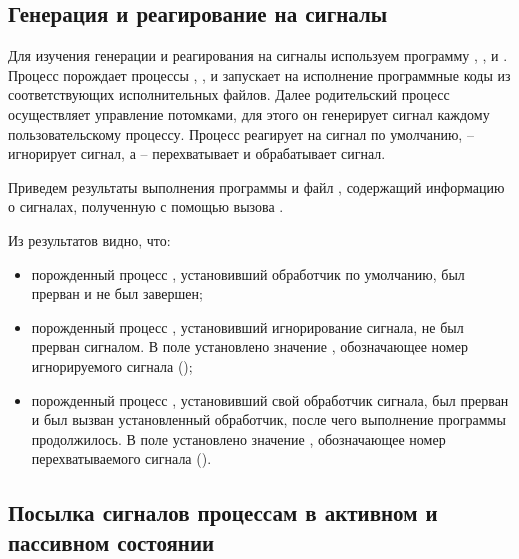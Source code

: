 \subsection{Генерация и реагирование на сигналы}

Для изучения генерации и реагирования на сигналы используем программу , ,  и . Процесс  порождает процессы , ,  и запускает на исполнение программные коды из соответствующих исполнительных файлов. Далее родительский процесс осуществляет управление потомками, для этого он генерирует сигнал каждому пользовательскому процессу. Процесс  реагирует на сигнал по умолчанию,  -- игнорирует сигнал, а  -- перехватывает и обрабатывает сигнал.









Приведем результаты выполнения программы  и файл , содержащий информацию о сигналах, полученную с помощью вызова .





Из результатов видно, что:
\begin{itemize}
	\item порожденный процесс , установивший обработчик по умолчанию, был прерван и не был завершен;
	\item порожденный процесс , установивший игнорирование сигнала, не был прерван сигналом. В поле  установлено значение , обозначающее номер игнорируемого сигнала ();
	\item порожденный процесс , установивший свой обработчик сигнала, был прерван и был вызван установленный обработчик, после чего выполнение программы продолжилось. В поле  установлено значение , обозначающее номер перехватываемого сигнала ().
\end{itemize}

\subsection{Посылка сигналов процессам в активном и пассивном состоянии}

